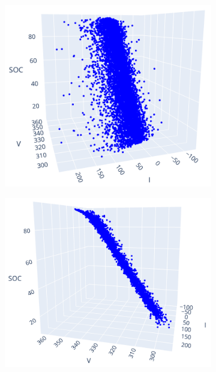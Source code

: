 \begin{figure}[htb!]
\centering
\begin{subfigure}[t]{0.475\textwidth}
    \centering
    \includegraphics[width=\textwidth]{images/visoc_synth1}
    \caption{}
    \label{fig:visoc_synth1}
\end{subfigure}
\hfill
\begin{subfigure}[t]{0.475\textwidth}
    \centering
    \includegraphics[width=\textwidth]{images/visoc_synth2}
    \caption{}
    \label{fig:visoc_synth2}

\end{subfigure}
\end{figure}
